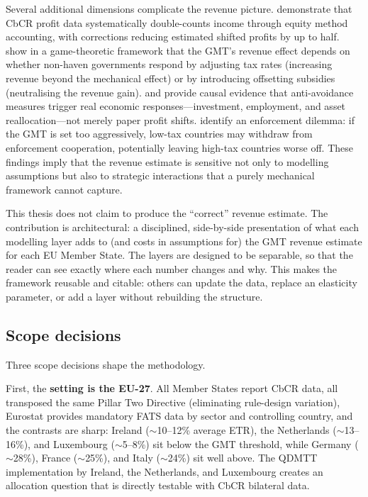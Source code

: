 \documentclass[11pt,a4paper]{article}
\begin{document}
Several additional dimensions complicate the revenue picture. \citet{blouin2023} demonstrate that CbCR profit data systematically double-counts income through equity method accounting, with corrections reducing estimated shifted profits by up to half. \citet{janeba2023} show in a game-theoretic framework that the GMT's revenue effect depends on whether non-haven governments respond by adjusting tax rates (increasing revenue beyond the mechanical effect) or by introducing offsetting subsidies (neutralising the revenue gain). \citet{bilicka2022} and \citet{suarezserrato2019} provide causal evidence that anti-avoidance measures trigger real economic responses---investment, employment, and asset reallocation---not merely paper profit shifts. \citet{hindriks2025} identify an enforcement dilemma: if the GMT is set too aggressively, low-tax countries may withdraw from enforcement cooperation, potentially leaving high-tax countries worse off. These findings imply that the revenue estimate is sensitive not only to modelling assumptions but also to strategic interactions that a purely mechanical framework cannot capture.

This thesis does not claim to produce the ``correct'' revenue estimate. The contribution is architectural: a disciplined, side-by-side presentation of what each modelling layer adds to (and costs in assumptions for) the GMT revenue estimate for each EU Member State. The layers are designed to be separable, so that the reader can see exactly where each number changes and why. This makes the framework reusable and citable: others can update the data, replace an elasticity parameter, or add a layer without rebuilding the structure.

\subsection{Scope decisions}\label{sec:scope}

Three scope decisions shape the methodology.

First, the \textbf{setting is the EU-27}. All Member States report CbCR data, all transposed the same Pillar Two Directive (eliminating rule-design variation), Eurostat provides mandatory FATS data by sector and controlling country, and the contrasts are sharp: Ireland ($\sim$10--12\% average ETR), the Netherlands ($\sim$13--16\%), and Luxembourg ($\sim$5--8\%) sit below the GMT threshold, while Germany ($\sim$28\%), France ($\sim$25\%), and Italy ($\sim$24\%) sit well above. The QDMTT implementation by Ireland, the Netherlands, and Luxembourg creates an allocation question that is directly testable with CbCR bilateral data.
\end{document}
